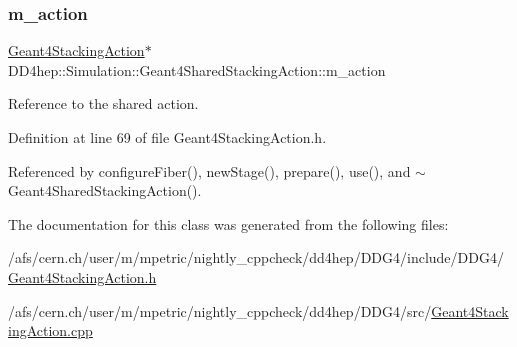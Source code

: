\subsubsection{\texorpdfstring{m\+\_\+action}{m\_action}}
{\footnotesize\ttfamily \hyperlink{class_d_d4hep_1_1_simulation_1_1_geant4_stacking_action}{Geant4\+Stacking\+Action}$\ast$ D\+D4hep\+::\+Simulation\+::\+Geant4\+Shared\+Stacking\+Action\+::m\+\_\+action\hspace{0.3cm}{\ttfamily [protected]}}



Reference to the shared action. 



Definition at line 69 of file Geant4\+Stacking\+Action.\+h.



Referenced by configure\+Fiber(), new\+Stage(), prepare(), use(), and $\sim$\+Geant4\+Shared\+Stacking\+Action().



The documentation for this class was generated from the following files\+:\begin{DoxyCompactItemize}
\item 
/afs/cern.\+ch/user/m/mpetric/nightly\+\_\+cppcheck/dd4hep/\+D\+D\+G4/include/\+D\+D\+G4/\hyperlink{_geant4_stacking_action_8h}{Geant4\+Stacking\+Action.\+h}\item 
/afs/cern.\+ch/user/m/mpetric/nightly\+\_\+cppcheck/dd4hep/\+D\+D\+G4/src/\hyperlink{_geant4_stacking_action_8cpp}{Geant4\+Stacking\+Action.\+cpp}\end{DoxyCompactItemize}
